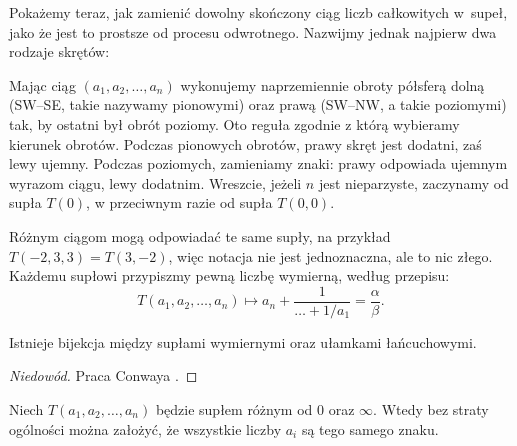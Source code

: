 Pokażemy teraz, jak zamienić dowolny skończony ciąg liczb całkowitych w~supeł, jako że jest to prostsze od procesu odwrotnego.
Nazwijmy jednak najpierw dwa rodzaje skrętów:
\begin{comment}
\begin{figure}[H]
    \centering
    \begin{minipage}[b]{.48\linewidth}
        \[\LargeTwistsRight\]
        \subcaption{skręty prawe}
    \end{minipage}
    \begin{minipage}[b]{.48\linewidth}
        \centering
        \[\LargeTwistsLeft\]
        \subcaption{skręty lewe}
    \end{minipage}
\end{figure}
\end{comment}

Mając ciąg $(a_1, a_2, \ldots, a_n)$ wykonujemy naprzemiennie obroty półsferą dolną (SW--SE, takie nazywamy pionowymi) oraz prawą (SW--NW, a takie poziomymi) tak, by ostatni był obrót poziomy.
Oto reguła zgodnie z którą wybieramy kierunek obrotów.
Podczas pionowych obrotów, prawy skręt jest dodatni, zaś lewy ujemny.
Podczas poziomych, zamieniamy znaki: prawy odpowiada ujemnym wyrazom ciągu, lewy dodatnim.
Wreszcie, jeżeli $n$ jest nieparzyste, zaczynamy od supła $T(0)$, w przeciwnym razie od supła $T(0, 0)$.

Różnym ciągom mogą odpowiadać te same supły, na przykład $T(-2, 3, 3) = T(3, -2)$, więc notacja nie jest jednoznaczna, ale to nic złego.
Każdemu supłowi przypiszmy pewną liczbę wymierną, według przepisu:
\begin{equation}
    T(a_1, a_2, \ldots, a_n) \mapsto a_n + \frac{1}{\ldots + 1/a_1} = \frac \alpha \beta.
\end{equation}

\begin{proposition}
    Istnieje bijekcja między supłami wymiernymi oraz ułamkami łańcuchowymi.
\end{proposition}

\begin{proof}[Niedowód]
    Praca Conwaya \cite[s. 331-332]{conway1970}.
\end{proof}

\begin{proposition}
    \label{prp:continued_fractions}
    Niech $T(a_1, a_2, \ldots, a_n)$ będzie supłem różnym od $0$ oraz $\infty$.
    Wtedy bez straty ogólności można założyć, że wszystkie liczby $a_i$ są tego samego znaku.
\end{proposition}


